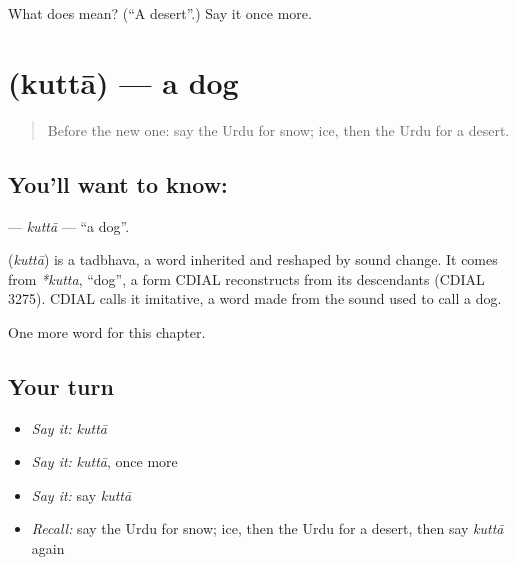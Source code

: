 \begin{tcolorbox}[breakable,colback=teal!4,colframe=teal!35!black,title={Before you move on}]
What does  mean? (\textquotedblleft{}A desert\textquotedblright{}.) Say it once more.
\end{tcolorbox}
\section[\texorpdfstring{\ur{کتا} (kuttā)}{کتا (kuttā)}]{ (kuttā) — a dog}

\label{lesson:UR-C67-kutta}



\begin{quote}
Before the new one: say the Urdu for snow; ice, then the Urdu for a desert.
\end{quote}

\subsection*{You'll want to know: }
\textbf{} — \emph{kuttā} — \textquotedblleft{}a dog\textquotedblright{}.

\begin{cousinweb}
\textbf{} (\emph{kuttā}) is a tadbhava, a word inherited and reshaped by sound change. It comes from \emph{*kutta}, \textquotedblleft{}dog\textquotedblright{}, a form CDIAL reconstructs from its descendants (CDIAL 3275). CDIAL calls it imitative, a word made from the sound used to call a dog.
\end{cousinweb}

\begin{grammarlens}[title={What you've built}]
One more word for this chapter.
\end{grammarlens}

\subsection*{Your turn}
\begin{itemize}
\raggedright
  \item \emph{Say it:} \emph{kuttā}
  \item \emph{Say it:} \emph{kuttā}, once more
  \item \emph{Say it:} say \emph{kuttā}
  \item \emph{Recall:} say the Urdu for snow; ice, then the Urdu for a desert, then say \emph{kuttā} again
\end{itemize}


